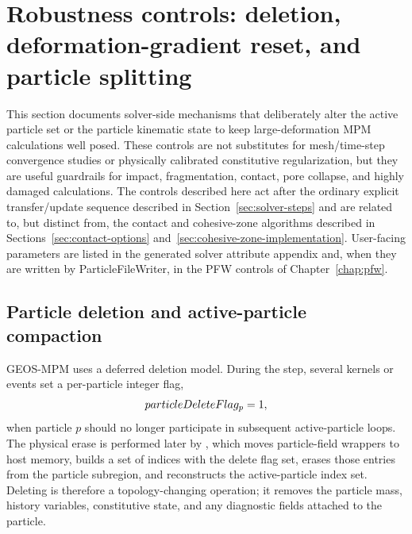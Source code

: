 \section{Robustness controls: deletion, deformation-gradient reset, and particle splitting}
\label{sec:robustness-controls}

This section documents solver-side mechanisms that deliberately alter the active particle set or the particle kinematic state to keep large-deformation MPM calculations well posed.  These controls are not substitutes for mesh/time-step convergence studies or physically calibrated constitutive regularization, but they are useful guardrails for impact, fragmentation, contact, pore collapse, and highly damaged calculations.  The controls described here act after the ordinary explicit transfer/update sequence described in Section~\ref{sec:solver-steps} and are related to, but distinct from, the contact and cohesive-zone algorithms described in Sections~\ref{sec:contact-options} and~\ref{sec:cohesive-zone-implementation}.  User-facing parameters are listed in the generated solver attribute appendix and, when they are written by ParticleFileWriter, in the PFW controls of Chapter~\ref{chap:pfw}.

\subsection{Particle deletion and active-particle compaction}
\label{subsec:robust-particle-deletion}

GEOS-MPM uses a deferred deletion model.  During the step, several kernels or events set a per-particle integer flag,
\begin{equation}
  particleDeleteFlag_p = 1,
\end{equation}
when particle $p$ should no longer participate in subsequent active-particle loops.  The physical erase is performed later by , which moves particle-field wrappers to host memory, builds a set of indices with the delete flag set, erases those entries from the particle subregion, and reconstructs the active-particle index set.  Deleting is therefore a topology-changing operation; it removes the particle mass, history variables, constitutive state, and any diagnostic fields attached to the particle.

